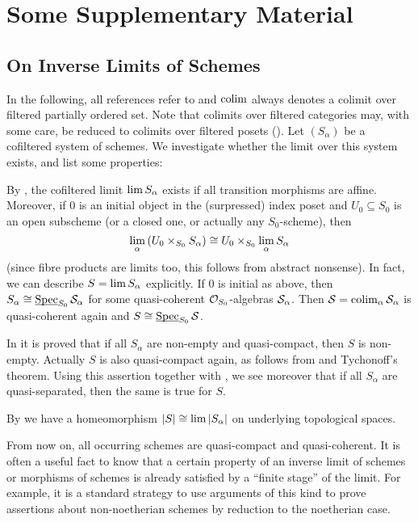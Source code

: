 \chapter{Some Supplementary Material}

\section{On Inverse Limits of Schemes}\label{sec:inverseLimits}
In the following, all references refer to \cite{stacks-project} and $\operatorname*{colim}$ always denotes a colimit over filtered partially ordered set. Note that colimits over filtered categories may, with some care, be reduced to colimits over filtered posets ().
\numpar{}\label{par:schemesInverseLimit}Let $(S_\alpha)$ be a cofiltered system of schemes. We investigate whether the limit over this system exists, and list some properties:
\begin{alphanumerate}
	\item By , the cofiltered limit $\operatorname*{lim} S_\alpha$ exists if all transition morphisms are affine. Moreover, if $0$ is an initial object in the (surpressed) index poset and $U_0\subseteq S_0$ is an open subscheme (or a closed one, or actually any $S_0$-scheme), then
	\begin{equation*}
	\operatorname*{lim}_\alpha \left(U_0\times_{S_0}S_\alpha\right)\cong U_0\times_{S_0}\operatorname*{lim}_\alpha S_\alpha
	\end{equation*}
	(since fibre products are limits too, this follows from abstract nonsense). In fact, we can describe $S=\operatorname*{lim} S_\alpha$ explicitly. If $0$ is initial as above, then $S_\alpha\cong \operatorname{\underline{\smash{\mathrm{Spec}}}}_{S_0}\mathcal{S}_\alpha$ for some quasi-coherent $\mathcal{O}_{S_0}$-algebras $\mathcal{S}_\alpha$. Then $\mathcal{S}=\operatorname*{colim}_\alpha \mathcal{S}_\alpha$ is quasi-coherent again and $S\cong \operatorname{\underline{\smash{\mathrm{Spec}}}}_{S_0}\mathcal{S}$.
	\item In  it is proved that if all $S_\alpha$ are non-empty and quasi-compact, then $S$ is non-empty. Actually $S$ is also quasi-compact again, as follows from  and Tychonoff's theorem. Using this assertion together with , we see moreover that if all $S_\alpha$ are quasi-separated, then the same is true for $S$.
	\item By  we have a homeomorphism $|S|\cong \operatorname*{lim} |S_\alpha|$ on underlying topological spaces.
\end{alphanumerate}
\numpar{}\label{par:descendingFinPres} From now on, all occurring schemes are quasi-compact and quasi-coherent. It is often a useful fact to know that a certain property of an inverse limit of schemes or morphisms of schemes is already satisfied by a \enquote{finite stage} of the limit. For example, it is a standard strategy to use arguments of this kind to prove assertions about non-noetherian schemes by reduction to the noetherian case.
